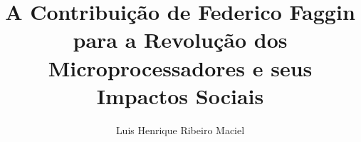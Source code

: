 \usepackage{cite}                        %
\usepackage{url}                         %
\usepackage{microtype}                   %

\usepackage[hidelinks]{hyperref}

\usepackage[nameinlink,noabbrev,brazilian]{cleveref}

\def\universidade{Universidade Federal de Minas Gerais}
\def\siglauni{UFMG}
\def\faculdade{Escola de Engenharia}
\def\departamento{Departamento de Engenharia Elétrica}
\def\disciplina{Descobertas de Engenharia Elétrica que Moldaram a Sociedade Contemporânea}
\def\semestre{2º/2026}
\def\autorartigo{Luis Henrique Ribeiro Maciel}
\def\emailautor{luishrm@ufmg.br}

\title{A Contribuição de Federico Faggin para a Revolução dos Microprocessadores e seus Impactos Sociais}

\author{\autorartigo%
}

